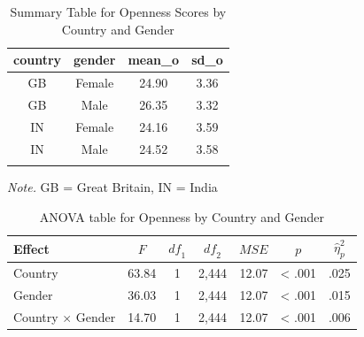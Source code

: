 \documentclass[
  english,
  man]{apa6}
\begin{document}
\begin{table}[tbp]

\begin{center}
\begin{threeparttable}

\caption{\label{tab:anova descriptives table}Summary Table for Openness Scores by Country and Gender}

\begin{tabular}{cccc}
\toprule
country & \multicolumn{1}{c}{gender} & \multicolumn{1}{c}{mean\_o} & \multicolumn{1}{c}{sd\_o}\\
\midrule
GB & Female & 24.90 & 3.36\\
GB & Male & 26.35 & 3.32\\
IN & Female & 24.16 & 3.59\\
IN & Male & 24.52 & 3.58\\
\bottomrule
\addlinespace
\end{tabular}

\begin{tablenotes}[para]
\normalsize{\textit{Note.} GB = Great Britain, IN = India}
\end{tablenotes}

\end{threeparttable}
\end{center}

\end{table}

\begin{table}[tbp]

\begin{center}
\begin{threeparttable}

\caption{\label{tab:anova_summary_table}ANOVA table for Openness by Country and Gender}

\begin{tabular}{lrcrrrl}
\toprule
Effect & \multicolumn{1}{c}{$F$} & \multicolumn{1}{c}{$\mathit{df}_1$} & \multicolumn{1}{c}{$\mathit{df}_2$} & \multicolumn{1}{c}{$\mathit{MSE}$} & \multicolumn{1}{c}{$p$} & \multicolumn{1}{c}{$\hat{\eta}^2_p$}\\
\midrule
Country & 63.84 & 1 & 2,444 & 12.07 & < .001 & .025\\
Gender & 36.03 & 1 & 2,444 & 12.07 & < .001 & .015\\
Country $\times$ Gender & 14.70 & 1 & 2,444 & 12.07 & < .001 & .006\\
\bottomrule
\end{tabular}

\end{threeparttable}
\end{center}

\end{table}
\end{document}
